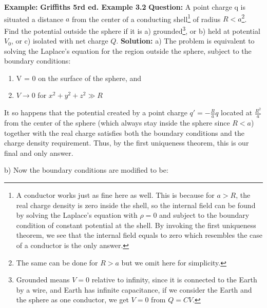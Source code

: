\documentclass[a4paper,12pt]{report}
\begin{document}
	\begin{example_template}
		\textbf{Example:} \textbf{Griffiths 5rd ed. Example 3.2} \newline \newline
		\textbf{Question:} A point charge q is situated a distance \(a\) from the center of a conducting shell\footnote{A conductor works just as fine here as well. This is because for \(a > R\), the real charge density is zero inside the shell, so the internal field can be found by solving the Laplace's equation with \(\rho = 0\) and subject to the boundary condition of constant potential at the shell. By invoking the first uniqueness theorem, we see that the internal field equals to zero which resembles the case of a conductor is the only answer.} of radius \(R < a\)\footnote{The same can be done for \(R > a\) but we omit here for simplicity.}. Find the potential outside the sphere if it is  \newline a) grounded\footnote{Grounded means \(V = 0 \) relative to infinity, since it is connected to the Earth by a wire, and Earth has infinite capacitance, if we consider the Earth and the sphere as one conductor, we get \(V = 0\) from \(Q = CV\).}, or \newline b) held at potential \(V_0\), or \newline c) isolated with net charge \(Q\). \newline \newline
		\textbf{Solution:} \newline a) The problem is equivalent to solving the Laplace's equation for the region outside the sphere, subject to the boundary conditions:
		
		\begin{enumerate}
			\item V = 0 on the surface of the sphere, and
			\item \(V \rightarrow 0\) for  \(x^2 + y^2 + z^2 \gg R\) 		
		\end{enumerate}
		
		It so happens that the potential created by a point charge \(q' = -\frac{R}{a} q\) located at \(\frac{R^2}{a} \) from the center of the sphere (which always stay inside the sphere since \(R < a\)) together with the real charge satisfies both the boundary conditions and the charge density requirement. Thus, by the first uniqueness theorem, this is our final and only answer. \newline
		
		b) Now the boundary conditions are modified to be:
		

\end{example_template}
\end{document}
